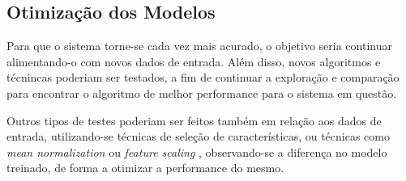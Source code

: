 		\subsection{Otimização dos Modelos}

			Para que o sistema torne-se cada vez mais acurado, o objetivo seria continuar alimentando-o com novos dados de entrada. Além disso, novos algoritmos e técnincas poderiam ser testados, a fim de continuar a exploração e comparação para encontrar o algoritmo de melhor performance para o sistema em questão.

			Outros tipos de testes poderiam ser feitos também em relação aos dados de entrada, utilizando-se técnicas de seleção de características, ou técnicas como \emph{mean normalization} ou \emph{feature scaling} \cite{Coursera}, observando-se a diferença no modelo treinado, de forma a otimizar a performance do mesmo.
